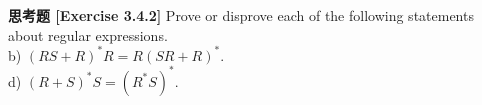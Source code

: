 \textbf{思考题 [Exercise 3.4.2]} Prove or disprove each of the following statements 
about regular expressions.\\
b) $(RS+R)^*R=R(SR+R)^*$.\\
d) $(R+S)^*S=(R^*S)^*$.